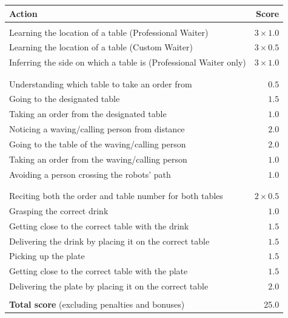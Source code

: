 \begin{tabularx}{\textwidth}{ X r }
	\textbf{Action} & \textbf{Score} \\ \hline
	\textbi{Training phase}  \\
	Learning the location of a table (Professional Waiter) & $3 \times 1.0$ \\
	Learning the location of a table (Custom Waiter) & $3 \times 0.5$ \\
	Inferring the side on which a table is (Professional Waiter only)& $3 \times 1.0$ \\
	\\
	\textbi{Ordering phase}  \\
	Understanding which table to take an order from & $0.5$ \\
	Going to the designated table & $1.5$ \\
	Taking an order from the designated table & $1.0$ \\
	Noticing a waving/calling person from distance & $2.0$ \\
	Going to the table of the waving/calling person & $2.0$ \\
	Taking an order from the waving/calling person & $1.0$ \\
	Avoiding a person crossing the robots' path & $1.0$ \\
	\\
	\textbi{Delivering phase}  \\
	Reciting both the order and table number for both tables & $2 \times 0.5$ \\
	Grasping the correct drink & $1.0$ \\
	Getting close to the correct table with the drink & $1.5$ \\
	Delivering the drink by placing it on the correct table & $1.5$ \\
	Picking up the plate & $1.5$ \\
	Getting close to the correct table with the plate & $1.5$ \\
	Delivering the plate by placing it on the correct table & $2.0$ \\
	\\ \hline
	\textbf{Total score} (excluding penalties and bonuses) & 25.0 \\
\end{tabularx}